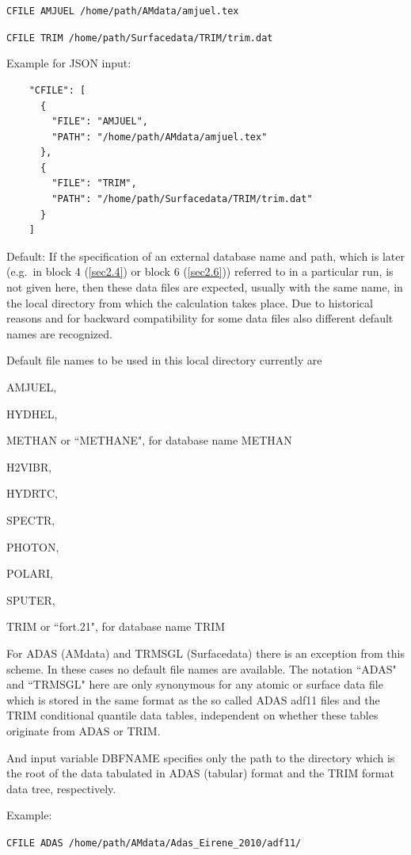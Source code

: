 \lstinline|CFILE AMJUEL /home/path/AMdata/amjuel.tex|

\lstinline|CFILE TRIM /home/path/Surfacedata/TRIM/trim.dat| 

\medskip

Example for JSON input:
\begin{lstlisting}
    "CFILE": [
      {
        "FILE": "AMJUEL",
        "PATH": "/home/path/AMdata/amjuel.tex"
      },
      {
        "FILE": "TRIM",
        "PATH": "/home/path/Surfacedata/TRIM/trim.dat"
      }
    ]
\end{lstlisting}

Default:
If the specification of an external database name and path, which is later
(e.g.\ in block 4 (\cref{sec2.4}) or block 6 (\cref{sec2.6})) referred to in a
particular run, is not given here, then these data files are expected, usually
with the same name, in the local directory from which the calculation takes
place.
Due to historical reasons and for backward compatibility for some data files
also different default names are recognized.

Default file names to be used in this local directory currently are

AMJUEL, 

HYDHEL, 

METHAN or ``METHANE", for database name METHAN 

H2VIBR, 

HYDRTC, 

SPECTR, 

PHOTON, 

POLARI, 

SPUTER, 

TRIM or ``fort.21",  for database name TRIM 

For ADAS (AMdata) and TRMSGL (Surfacedata) there is an exception from this
scheme.
In these cases no default file names are available.
The notation ``ADAS" and ``TRMSGL" here are only synonymous for any atomic or
surface data file which is stored in the same format as the so called \ac{ADAS}
adf11 files and the TRIM conditional quantile data tables, independent on
whether these tables originate from \ac{ADAS} or TRIM.

And input variable DBFNAME specifies only the path to the directory which is
the root of the data tabulated in \ac{ADAS} (tabular) format and the TRIM
format data tree, respectively.

Example:

\lstinline|CFILE ADAS /home/path/AMdata/Adas_Eirene_2010/adf11/|

